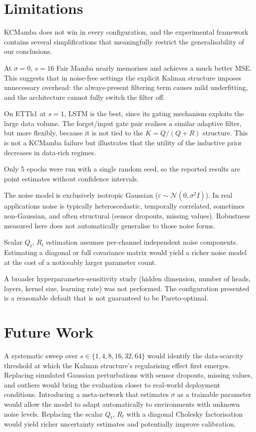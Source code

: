 \section{Limitations}

KCMamba does not win in every configuration, and the experimental
framework contains several simplifications that meaningfully restrict the
generalisability of our conclusions.

At $\sigma=0$, $s=16$ Fair Mamba nearly memorises and achieves a much better
MSE. This suggests that in noise-free settings the explicit Kalman structure
imposes unnecessary overhead: the always-present filtering term causes mild
underfitting, and the architecture cannot fully switch the filter off.

On ETTh1 at $s=1$, LSTM is the best, since its gating mechanism exploits the large
data volume. The forget/input gate pair realises a similar adaptive filter, but
more flexibly, because it is not tied to the $K = Q/(Q+R)$ structure. This is
not a KCMamba failure but illustrates that the utility of the inductive prior
decreases in data-rich regimes.

Only 5 epochs were run with a single random seed, so the reported results are
point estimates without confidence intervals.

The noise model is exclusively isotropic Gaussian
($\varepsilon \sim \mathcal{N}(0, \sigma^2 I)$). In real applications noise is
typically heteroscedastic, temporally correlated, sometimes non-Gaussian, and
often structural (sensor dropouts, missing values). Robustness measured here
does not automatically generalise to those noise forms.

Scalar $Q_t$, $R_t$ estimation assumes per-channel independent noise
components. Estimating a diagonal or full covariance matrix would yield a
richer noise model at the cost of a noticeably larger parameter count.

A broader hyperparameter-sensitivity study (hidden dimension, number of heads,
layers, kernel size, learning rate) was not performed. The configuration
presented is a reasonable default that is not guaranteed to be Pareto-optimal.

\section{Future Work}

A systematic sweep over $s \in \{1, 4, 8, 16, 32, 64\}$ would identify the
data-scarcity threshold at which the Kalman structure's regularising effect
first emerges. Replacing simulated Gaussian perturbations with sensor dropouts,
missing values, and outliers would bring the evaluation closer to real-world
deployment conditions. Introducing a meta-network that estimates $\sigma$ as a
trainable parameter would allow the model to adapt automatically to environments
with unknown noise levels. Replacing the scalar $Q_t$, $R_t$ with a diagonal
Cholesky factorisation would yield richer uncertainty estimates and potentially
improve calibration.

